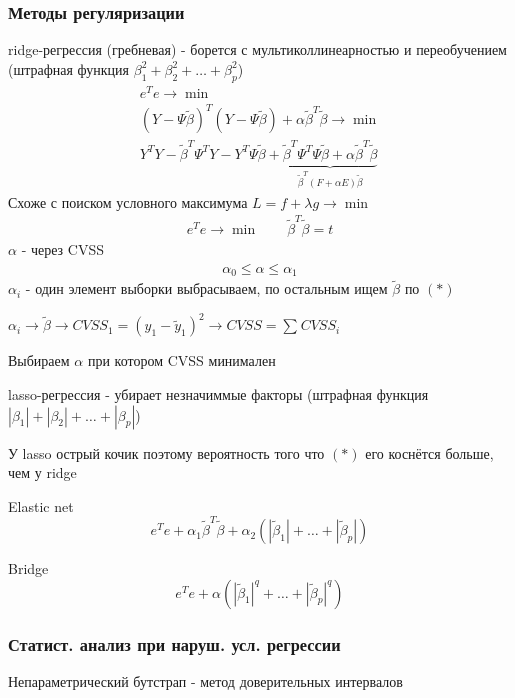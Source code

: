 \documentclass{article}
\begin{document}
\subsubsection{Методы регуляризации}
ridge-регрессия (гребневая) - борется с мультиколлинеарностью и переобучением 
(штрафная функция $\beta_1^{2}+\beta_2^{2}+\dots +\beta_p^{2}$)
\begin{gather*}
  e^{T}e \to \min \\ 
  (Y - \Psi \tilde{\beta})^{T}(Y-\Psi \tilde{\beta}) + \alpha\tilde{\beta}^{T}\tilde{\beta}\to \min \tag{$\ast$} \\ 
  Y^{T}Y - \tilde{\beta}^{T}\Psi^{T}Y - Y^{T}\Psi\tilde{\beta}+ \underbrace{\tilde{\beta}^{T}\Psi^{T}\Psi\tilde{\beta} + \alpha\tilde{\beta}^{T}\tilde{\beta}}_{\tilde{\beta}^{T}(F+\alpha E)\tilde{\beta}}
\end{gather*}
Схоже с поиском условного максимума $L=f+\lambda g \to \min$
\begin{gather*}
  e^{T}e \to \min \qquad \tilde{\beta}^{T}\tilde{\beta}=t
\end{gather*}
$\alpha$ - через CVSS 
\begin{gather*}
  \alpha_0 \le \alpha \le \alpha_1 
\end{gather*}
$\alpha_i$ - один элемент выборки выбрасываем, по остальным ищем $\tilde{\beta}$ по $(\ast)$

$\alpha_i \rightarrow \tilde{\beta} \rightarrow CVSS_1=(y_1-\tilde{y}_1)^{2} \rightarrow CVSS=\sum_{}^{}CVSS_i$

Выбираем $\alpha$ при котором CVSS минимален

\hr 
lasso-регрессия - убирает незначиммые факторы (штрафная функция $|\beta_1|+|\beta_2|+\dots +|\beta_p|$)


У lasso острый кочик поэтому вероятность того что $(\ast)$ его коснётся больше, чем у ridge

\hr
Elastic net
\[
  e^{T}e+\alpha_1 \tilde{\beta}^{T}\tilde{\beta}+\alpha_2(|\tilde{\beta}_1|+\dots +|\tilde{\beta}_p|)
\]

\hr 
Bridge
\[
  e^{T}e + \alpha (|\tilde{\beta}_1|^{q}+\dots +|\tilde{\beta}_p|^{q})
\]

\subsubsection{Статист. анализ при наруш. усл. регрессии}
Непараметрический бутстрап - метод доверительных интервалов
\end{document}
